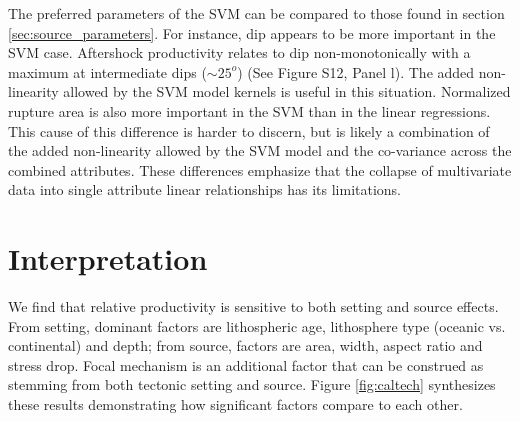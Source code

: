 \documentclass[draft, jgrga]{agujournal2018}
\begin{document}
The preferred parameters of the SVM can be compared to those found in section \ref{sec:source_parameters}. For instance, dip appears to be more important in the SVM case. Aftershock productivity relates to dip non-monotonically with a maximum at intermediate  dips ($\sim 25^o$) (See Figure S12, Panel l). The added non-linearity allowed by the SVM model kernels is useful in this situation. Normalized rupture area is also more important in the SVM than in the linear regressions. This cause of this difference is harder to discern, but is likely a combination of the added non-linearity allowed by the SVM model and the co-variance across the combined attributes. These differences emphasize that the collapse of multivariate data into single attribute linear relationships has its limitations.




\section{Interpretation}

We find that relative productivity is sensitive to both setting and source effects. From setting, dominant factors are lithospheric age, lithosphere type (oceanic vs. continental) and depth; from source, factors are area, width, aspect ratio and stress drop. Focal mechanism is an additional factor that can be construed as stemming from both tectonic setting and source. Figure \ref{fig:caltech} synthesizes these results demonstrating how significant factors compare to each other. 
\end{document}
